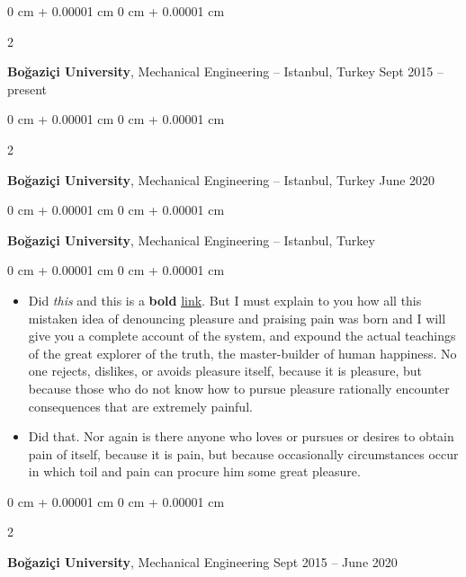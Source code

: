 \documentclass[10pt, letterpaper]{article}
\newenvironment{highlights}{
    \begin{itemize}[
        topsep=0.10 cm,
        parsep=0.10 cm,
        partopsep=0pt,
        itemsep=0pt,
        leftmargin=0 cm + 10pt
    ]
}{
    \end{itemize}
} %
\newenvironment{onecolentry}{
    \begin{adjustwidth}{
        0 cm + 0.00001 cm
    }{
        0 cm + 0.00001 cm
    }
}{
    \end{adjustwidth}
} %
\newenvironment{twocolentry}[2][]{
    \onecolentry
    \def\secondColumn{#2}
    \setcolumnwidth{\fill, 4.5 cm}
    \begin{paracol}{2}
}{
    \switchcolumn \raggedleft \secondColumn
    \end{paracol}
    \endonecolentry
} %
\begin{document}
        \vspace{0.2 cm}

        \begin{twocolentry}{
            Sept 2015 – present
        }
            \textbf{Boğaziçi University}, Mechanical Engineering -- Istanbul, Turkey\end{twocolentry}



        \vspace{0.2 cm}

        \begin{twocolentry}{
            June 2020
        }
            \textbf{Boğaziçi University}, Mechanical Engineering -- Istanbul, Turkey\end{twocolentry}



        \vspace{0.2 cm}

        \begin{onecolentry}
            \textbf{Boğaziçi University}, Mechanical Engineering -- Istanbul, Turkey\end{onecolentry}

        \vspace{0.10 cm}
        \begin{onecolentry}
            \begin{highlights}
                \item Did \textit{this} and this is a \textbf{bold} \href{https://example.com}{link}. But I must explain to you how all this mistaken idea of denouncing pleasure and praising pain was born and I will give you a complete account of the system, and expound the actual teachings of the great explorer of the truth, the master-builder of human happiness. No one rejects, dislikes, or avoids pleasure itself, because it is pleasure, but because those who do not know how to pursue pleasure rationally encounter consequences that are extremely painful.
                \item Did that. Nor again is there anyone who loves or pursues or desires to obtain pain of itself, because it is pain, but because occasionally circumstances occur in which toil and pain can procure him some great pleasure.
            \end{highlights}
        \end{onecolentry}


        \vspace{0.2 cm}

        \begin{twocolentry}{
            Sept 2015 – June 2020
        }
            \textbf{Boğaziçi University}, Mechanical Engineering\end{twocolentry}
\end{document}
